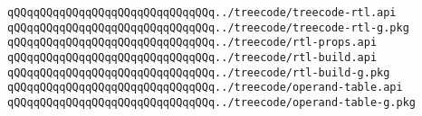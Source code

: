\newline
\verb|qQQqqQQqqQQqqQQqqQQqqQQqqQQqqQQq../treecode/treecode-rtl.api|\newline
\verb|qQQqqQQqqQQqqQQqqQQqqQQqqQQqqQQq../treecode/treecode-rtl-g.pkg|\newline
\verb|qQQqqQQqqQQqqQQqqQQqqQQqqQQqqQQq../treecode/rtl-props.api|\newline
\verb|qQQqqQQqqQQqqQQqqQQqqQQqqQQqqQQq../treecode/rtl-build.api|\newline
\verb|qQQqqQQqqQQqqQQqqQQqqQQqqQQqqQQq../treecode/rtl-build-g.pkg|\newline
\verb|qQQqqQQqqQQqqQQqqQQqqQQqqQQqqQQq../treecode/operand-table.api|\newline
\verb|qQQqqQQqqQQqqQQqqQQqqQQqqQQqqQQq../treecode/operand-table-g.pkg|\newline


